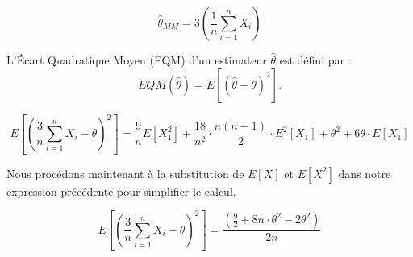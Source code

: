 \documentclass[../main.tex]{subfiles}
\begin{document}
\begin{CJK*}{UTF8}{gbsn}
\begin{equation}
\hat{\theta}_{MM} = 3\left(\frac{1}{n}\sum_{i=1}^{n}X_i\right)
\end{equation}

L'Écart Quadratique Moyen (EQM) d'un estimateur $\hat{\theta}$ est défini par :
\begin{equation}
EQM(\hat{\theta}) = E[(\hat{\theta} - \theta)^2].
\end{equation}

\begin{equation}
E\left[\left(\frac{3}{n}\sum_{i=1}^{n}X_i - \theta\right)^2\right] = \frac{9}{n} E[X_1^2] + \frac{18}{n^2} \cdot \frac{n(n-1)}{2} \cdot E^2[X_1] + \theta^2 + 6\theta \cdot E[X_1]
\end{equation}

Nous procédons maintenant à la substitution de $E[X]$ et $E[X^2]$ dans notre expression précédente pour simplifier le calcul.

\begin{equation}
E\left[\left(\frac{3}{n}\sum_{i=1}^{n}X_i - \theta\right)^2\right] = \frac {\left(\frac{9}{2} + 8n \cdot \theta^2 - 2\theta^2\right)}{2n}
\end{equation}


\end{CJK*}
\end{document}
